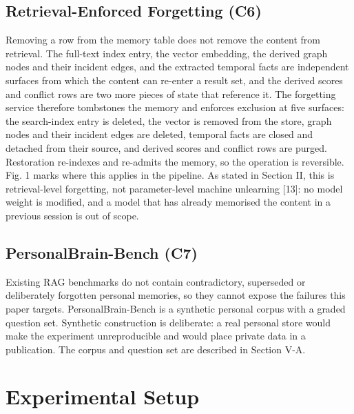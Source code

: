 \documentclass[conference]{IEEEtran}
\begin{document}
\subsection{Retrieval-Enforced Forgetting (C6)}
Removing a row from the memory table does not remove the content from retrieval. The full-text index entry, the vector embedding, the derived graph nodes and their incident edges, and the extracted temporal facts are independent surfaces from which the content can re-enter a result set, and the derived scores and conflict rows are two more pieces of state that reference it. The forgetting service therefore tombstones the memory and enforces exclusion at five surfaces: the search-index entry is deleted, the vector is removed from the store, graph nodes and their incident edges are deleted, temporal facts are closed and detached from their source, and derived scores and conflict rows are purged. Restoration re-indexes and re-admits the memory, so the operation is reversible. Fig. 1 marks where this applies in the pipeline.
As stated in Section II, this is retrieval-level forgetting, not parameter-level machine unlearning [13]: no model weight is modified, and a model that has already memorised the content in a previous session is out of scope.
\subsection{PersonalBrain-Bench (C7)}
Existing RAG benchmarks do not contain contradictory, superseded or deliberately forgotten personal memories, so they cannot expose the failures this paper targets. PersonalBrain-Bench is a synthetic personal corpus with a graded question set. Synthetic construction is deliberate: a real personal store would make the experiment unreproducible and would place private data in a publication. The corpus and question set are described in Section V-A.
\section{Experimental Setup}
\end{document}
